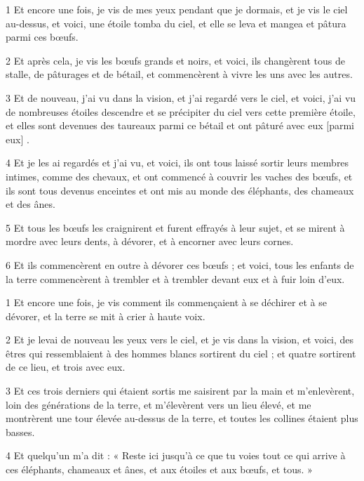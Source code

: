 \par 1 Et encore une fois, je vis de mes yeux pendant que je dormais, et je vis le ciel au-dessus, et voici, une étoile tomba du ciel, et elle se leva et mangea et pâtura parmi ces bœufs.
\par 2 Et après cela, je vis les bœufs grands et noirs, et voici, ils changèrent tous de stalle, de pâturages et de bétail, et commencèrent à vivre les uns avec les autres.
\par 3 Et de nouveau, j'ai vu dans la vision, et j'ai regardé vers le ciel, et voici, j'ai vu de nombreuses étoiles descendre et se précipiter du ciel vers cette première étoile, et elles sont devenues des taureaux parmi ce bétail et ont pâturé avec eux [parmi eux] .
\par 4 Et je les ai regardés et j'ai vu, et voici, ils ont tous laissé sortir leurs membres intimes, comme des chevaux, et ont commencé à couvrir les vaches des bœufs, et ils sont tous devenus enceintes et ont mis au monde des éléphants, des chameaux et des ânes.
\par 5 Et tous les bœufs les craignirent et furent effrayés à leur sujet, et se mirent à mordre avec leurs dents, à dévorer, et à encorner avec leurs cornes.
\par 6 Et ils commencèrent en outre à dévorer ces bœufs ; et voici, tous les enfants de la terre commencèrent à trembler et à trembler devant eux et à fuir loin d'eux.


\par 1 Et encore une fois, je vis comment ils commençaient à se déchirer et à se dévorer, et la terre se mit à crier à haute voix.
\par 2 Et je levai de nouveau les yeux vers le ciel, et je vis dans la vision, et voici, des êtres qui ressemblaient à des hommes blancs sortirent du ciel ; et quatre sortirent de ce lieu, et trois avec eux.
\par 3 Et ces trois derniers qui étaient sortis me saisirent par la main et m'enlevèrent, loin des générations de la terre, et m'élevèrent vers un lieu élevé, et me montrèrent une tour élevée au-dessus de la terre, et toutes les collines étaient plus basses.
\par 4 Et quelqu'un m'a dit : « Reste ici jusqu'à ce que tu voies tout ce qui arrive à ces éléphants, chameaux et ânes, et aux étoiles et aux bœufs, et tous. »


